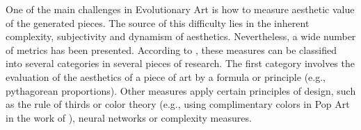 One of the main challenges in Evolutionary Art is how to measure
aesthetic value of the generated pieces. The source of this difficulty
lies in the inherent complexity, subjectivity and dynamism of
aesthetics. Nevertheless, a wide number of metrics has been
presented. According to 
\cite{galanter2012computational}, these measures can be classified
into several categories in several pieces of research. The first
category involves the evaluation of the aesthetics of a piece of art
by a formula or principle (e.g., pythagorean proportions). Other
measures apply certain principles of design, such as the rule of
thirds or color theory (e.g., using complimentary colors in Pop Art in
the work of  \cite{den2012evolving}),
neural networks or complexity measures.   %


